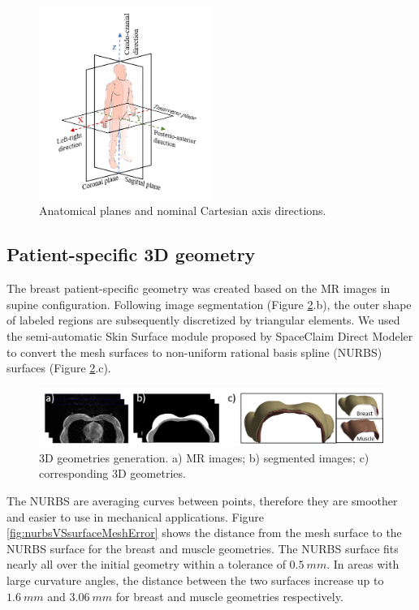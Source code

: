 \begin{figure}[!ht]
\centering
\includegraphics[width=0.5\textwidth,keepaspectratio]{figures/xyz_axis_directions.png} 
\caption{Anatomical planes and nominal Cartesian axis directions.}\label{fig:xyz_axis_directions}
\end{figure}

\subsection{Patient-specific 3D geometry}\label{subsection:patientspecificgeometry}

The breast patient-specific geometry was created based on the MR images in supine configuration. Following image segmentation (Figure \ref{fig:3dgeometries}.b), the outer shape of labeled regions are subsequently discretized by triangular elements.  We used the semi-automatic Skin Surface module proposed by SpaceClaim Direct Modeler to convert the mesh surfaces to non-uniform rational basis spline (NURBS) surfaces (Figure \ref{fig:3dgeometries}.c). 

\begin{figure}[!h]
\centering
\includegraphics[width=\textwidth,keepaspectratio]{figures/3dgeometries.png} 
\caption{3D geometries generation. a) MR images; b) segmented images; c) corresponding 3D geometries.} \label{fig:3dgeometries}
\end{figure}

The NURBS are averaging curves between points, therefore they are smoother and easier to use in mechanical applications. Figure \ref{fig:nurbsVSsurfaceMeshError} shows the distance from the mesh surface to the NURBS surface for the breast and muscle geometries. The NURBS surface fits nearly all over the initial geometry within a tolerance of $0.5\ mm$. In areas with large curvature angles, the distance between the two surfaces increase up to $1.6\ mm$ and $3.06\ mm$ for breast and muscle geometries respectively.
 


